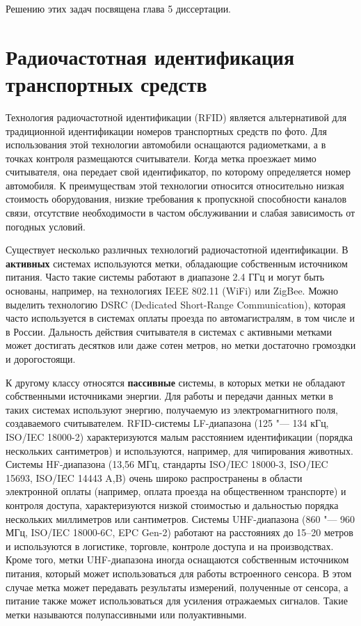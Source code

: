 Решению этих задач посвящена глава 5 диссертации.



\section{Радиочастотная идентификация транспортных средств}\label{sec:ch1_rfid}

Технология радиочастотной идентификации (RFID) является альтернативой для традиционной идентификации номеров транспортных средств по фото. Для использования этой технологии автомобили оснащаются радиометками, а в точках контроля размещаются считыватели. Когда метка проезжает мимо считывателя, она передает свой идентификатор, по которому определяется номер автомобиля. К преимуществам этой технологии относится относительно низкая стоимость оборудования, низкие требования к пропускной способности каналов связи, отсутствие необходимости в частом обслуживании и слабая зависимость от погодных условий.

Существует несколько различных технологий радиочастотной идентификации. В \textbf{активных} системах используются метки, обладающие собственным источником питания. Часто такие системы работают в диапазоне 2.4 ГГц и могут быть основаны, например, на технологиях IEEE 802.11 (WiFi) или ZigBee. Можно выделить технологию DSRC (Dedicated Short-Range Communication), которая часто используется в системах оплаты проезда по автомагистралям, в том числе и в России. Дальность действия считывателя в системах с активными метками может достигать десятков или даже сотен метров, но метки достаточно громоздки и дорогостоящи.

К другому классу относятся \textbf{пассивные} системы, в которых метки не обладают собственными источниками энергии. Для работы и передачи данных метки в таких системах используют энергию, получаемую из электромагнитного поля, создаваемого считывателем. RFID-системы LF-диапазона (125 "--- 134 кГц, ISO/IEC 18000-2) характеризуются малым расстоянием идентификации (порядка нескольких сантиметров) и используются, например, для чипирования животных. Системы HF-диапазона (13,56 МГц, стандарты ISO/IEC 18000-3, ISO/IEC 15693, ISO/IEC 14443 A,B) очень широко распространены в области электронной оплаты (например, оплата проезда на общественном транспорте) и контроля доступа, характеризуются низкой стоимостью и дальностью порядка нескольких миллиметров или сантиметров. Системы UHF-диапазона (860 "--- 960 МГц, ISO/IEC 18000-6C, EPC Gen-2) работают на расстояниях до 15--20 метров и используются в логистике, торговле, контроле доступа и на производствах. Кроме того, метки UHF-диапазона иногда оснащаются собственным источником питания, который может использоваться для работы встроенного сенсора. В этом случае метка может передавать результаты измерений, полученные от сенсора, а питание также может использоваться для усиления отражаемых сигналов. Такие метки называются полупассивными или полуактивными.


